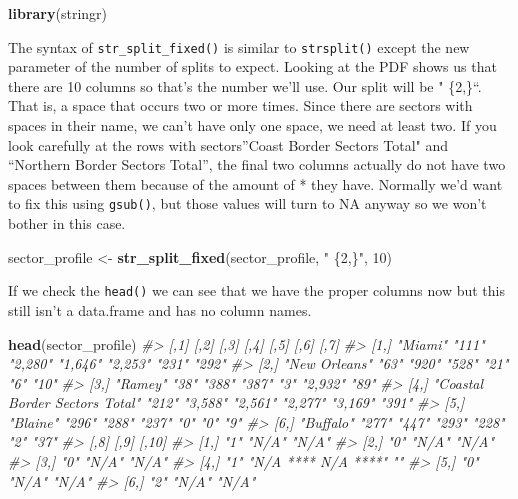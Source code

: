 \documentclass[
  12pt,
]{book}
\newenvironment{Shaded}{\begin{snugshade}}{\end{snugshade}}
\newcommand{\CommentTok}[1]{\textcolor[rgb]{0.56,0.35,0.01}{\textit{#1}}}
\newcommand{\DecValTok}[1]{\textcolor[rgb]{0.00,0.00,0.81}{#1}}
\newcommand{\KeywordTok}[1]{\textcolor[rgb]{0.13,0.29,0.53}{\textbf{#1}}}
\newcommand{\NormalTok}[1]{#1}
\newcommand{\StringTok}[1]{\textcolor[rgb]{0.31,0.60,0.02}{#1}}
\begin{document}
\begin{Shaded}
\begin{Highlighting}[]
\KeywordTok{library}\NormalTok{(stringr)}
\end{Highlighting}
\end{Shaded}

The syntax of \texttt{str\_split\_fixed()} is similar to \texttt{strsplit()} except the new parameter of the number of splits to expect. Looking at the PDF shows us that there are 10 columns so that's the number we'll use. Our split will be " \{2,\}``. That is, a space that occurs two or more times. Since there are sectors with spaces in their name, we can't have only one space, we need at least two. If you look carefully at the rows with sectors''Coast Border Sectors Total" and ``Northern Border Sectors Total'', the final two columns actually do not have two spaces between them because of the amount of * they have. Normally we'd want to fix this using \texttt{gsub()}, but those values will turn to NA anyway so we won't bother in this case.

\begin{Shaded}
\begin{Highlighting}[]
\NormalTok{sector\_profile <{-}}\StringTok{ }\KeywordTok{str\_split\_fixed}\NormalTok{(sector\_profile, }\StringTok{" \{2,\}"}\NormalTok{, }\DecValTok{10}\NormalTok{)}
\end{Highlighting}
\end{Shaded}

If we check the \texttt{head()} we can see that we have the proper columns now but this still isn't a data.frame and has no column names.

\begin{Shaded}
\begin{Highlighting}[]
\KeywordTok{head}\NormalTok{(sector\_profile)}
\CommentTok{\#>      [,1]                           [,2]  [,3]    [,4]    [,5]    [,6]    [,7] }
\CommentTok{\#> [1,] "Miami"                        "111" "2,280" "1,646" "2,253" "231"   "292"}
\CommentTok{\#> [2,] "New Orleans"                  "63"  "920"   "528"   "21"    "6"     "10" }
\CommentTok{\#> [3,] "Ramey"                        "38"  "388"   "387"   "3"     "2,932" "89" }
\CommentTok{\#> [4,] "Coastal Border Sectors Total" "212" "3,588" "2,561" "2,277" "3,169" "391"}
\CommentTok{\#> [5,] "Blaine"                       "296" "288"   "237"   "0"     "0"     "9"  }
\CommentTok{\#> [6,] "Buffalo"                      "277" "447"   "293"   "228"   "2"     "37" }
\CommentTok{\#>      [,8] [,9]                [,10]}
\CommentTok{\#> [1,] "1"  "N/A"               "N/A"}
\CommentTok{\#> [2,] "0"  "N/A"               "N/A"}
\CommentTok{\#> [3,] "0"  "N/A"               "N/A"}
\CommentTok{\#> [4,] "1"  "N/A **** N/A ****" ""   }
\CommentTok{\#> [5,] "0"  "N/A"               "N/A"}
\CommentTok{\#> [6,] "2"  "N/A"               "N/A"}
\end{Highlighting}
\end{Shaded}
\end{document}
